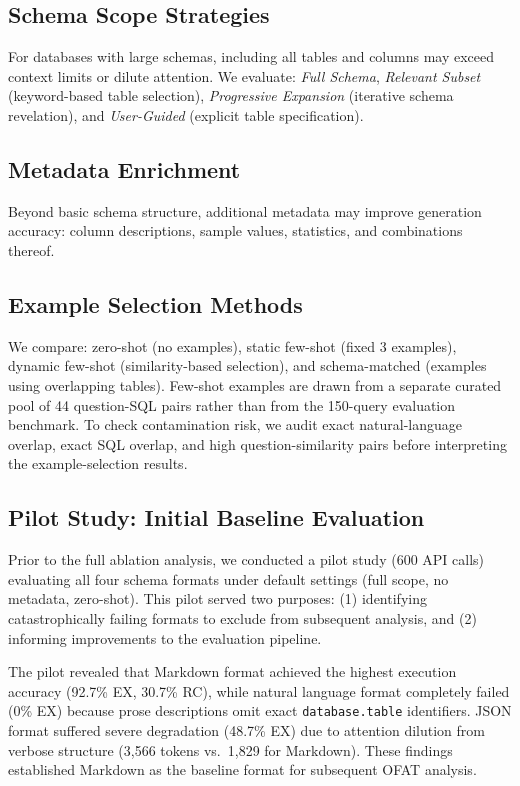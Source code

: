 \documentclass[sigconf, nonacm]{acmart}
\begin{document}
\subsection{Schema Scope Strategies}
For databases with large schemas, including all tables and columns may exceed context limits or dilute attention. We evaluate: \emph{Full Schema}, \emph{Relevant Subset} (keyword-based table selection), \emph{Progressive Expansion} (iterative schema revelation), and \emph{User-Guided} (explicit table specification).

\subsection{Metadata Enrichment}
Beyond basic schema structure, additional metadata may improve generation accuracy: column descriptions, sample values, statistics, and combinations thereof.

\subsection{Example Selection Methods}
We compare: zero-shot (no examples), static few-shot (fixed 3 examples), dynamic few-shot (similarity-based selection), and schema-matched (examples using overlapping tables). Few-shot examples are drawn from a separate curated pool of 44 question-SQL pairs rather than from the 150-query evaluation benchmark. To check contamination risk, we audit exact natural-language overlap, exact SQL overlap, and high question-similarity pairs before interpreting the example-selection results.

\subsection{Pilot Study: Initial Baseline Evaluation}
\label{sec:pilot}

Prior to the full ablation analysis, we conducted a pilot study (600 API calls) evaluating all four schema formats under default settings (full scope, no metadata, zero-shot). This pilot served two purposes: (1) identifying catastrophically failing formats to exclude from subsequent analysis, and (2) informing improvements to the evaluation pipeline.

The pilot revealed that Markdown format achieved the highest execution accuracy (92.7\% EX, 30.7\% RC), while natural language format completely failed (0\% EX) because prose descriptions omit exact \texttt{database.table} identifiers. JSON format suffered severe degradation (48.7\% EX) due to attention dilution from verbose structure (3,566 tokens vs.\ 1,829 for Markdown). These findings established Markdown as the baseline format for subsequent OFAT analysis.
\end{document}
